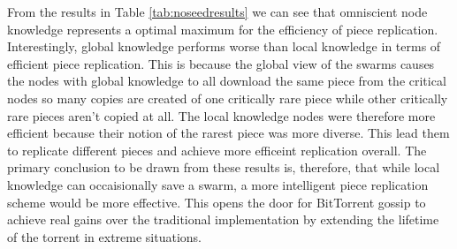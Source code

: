 

From the results in Table \ref{tab:noseedresults} we can see that omniscient node knowledge
represents a optimal maximum for the efficiency of piece
replication. Interestingly, global knowledge performs worse than local
knowledge in terms of efficient piece replication. This is because the
global view of the swarms causes the nodes with global knowledge to all
download the same piece from the critical nodes so many copies are
created of one critically rare piece while other critically rare
pieces aren't copied at all. The local knowledge nodes were therefore
more efficient because their notion of the rarest piece was more
diverse. This lead them to replicate different pieces and achieve more
efficeint replication overall. The primary conclusion to be drawn from
these results is, therefore, that while local knowledge can
occaisionally save a swarm, a more intelligent piece replication scheme
would be more effective. This opens the door for BitTorrent gossip to
achieve real gains over the traditional implementation by extending
the lifetime of the torrent in extreme situations.
